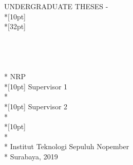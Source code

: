 \newpage
	\sffamily
	\thispagestyle{empty}
	{\noindent UNDERGRADUATE THESES - \kodematkul } \\*[10pt]
	{\large\textbf{\MakeUppercase{\juduleng}}} \\*[32pt]
	\\
	\\
	\\
	\\
	\MakeUppercase{\penulis} \\*
	NRP \nrp \\*[10pt]
	Supervisor 1 \\*
	\pembimbingsatu \\*[10pt]
	Supervisor 2 \\*
	\pembimbingdua \\*[10pt]
	\MakeUppercase{\jurusaneng} \\*
	\fakultaseng \\*
	Institut Teknologi Sepuluh Nopember \\*
	Surabaya, 2019
	\rmfamily
	\normalsize
	\restoregeometry
	\color{black}
	\cleardoublepage
